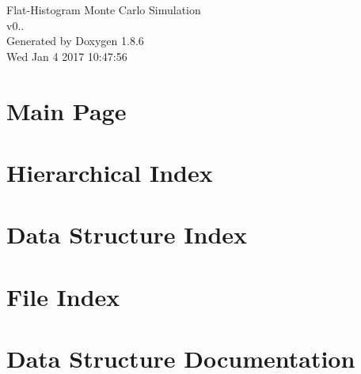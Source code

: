 \documentclass[twoside]{book}
\newcommand{\clearemptydoublepage}{%
  \newpage{\pagestyle{empty}\cleardoublepage}%
}
\begin{document}
\hypersetup{pageanchor=false}
\begin{titlepage}
\vspace*{7cm}
\begin{center}%
{\Large Flat-\/\-Histogram Monte Carlo Simulation \\[1ex]\large v0.. }\\
\vspace*{1cm}
{\large Generated by Doxygen 1.8.6}\\
\vspace*{0.5cm}
{\small Wed Jan 4 2017 10:47:56}\\
\end{center}
\end{titlepage}
\clearemptydoublepage
\tableofcontents
\clearemptydoublepage
{}
\hypersetup{pageanchor=true}

\chapter{Main Page}
\label{index}\hypertarget{index}{}
\chapter{Hierarchical Index}

\chapter{Data Structure Index}

\chapter{File Index}

\chapter{Data Structure Documentation}































\end{document}
